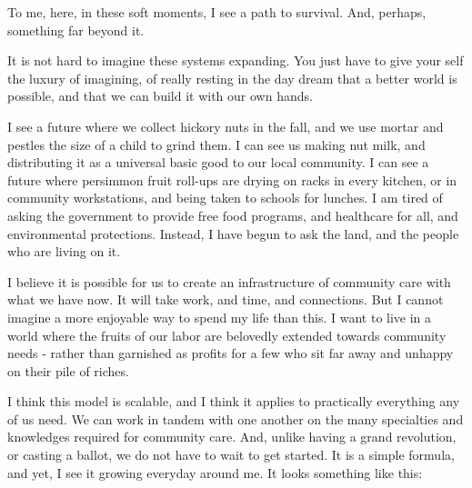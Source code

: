 \documentclass[
]{book}
\begin{document}
To me, here, in these soft moments, I see a path to survival. And, perhaps, something far beyond it.

It is not hard to imagine these systems expanding. You just have to give your self the luxury of imagining, of really resting in the day dream that a better world is possible, and that we can build it with our own hands.

I see a future where we collect hickory nuts in the fall, and we use mortar and pestles the size of a child to grind them. I can see us making nut milk, and distributing it as a universal basic good to our local community. I can see a future where persimmon fruit roll-ups are drying on racks in every kitchen, or in community workstations, and being taken to schools for lunches. I am tired of asking the government to provide free food programs, and healthcare for all, and environmental protections. Instead, I have begun to ask the land, and the people who are living on it.

I believe it is possible for us to create an infrastructure of community care with what we have now. It will take work, and time, and connections. But I cannot imagine a more enjoyable way to spend my life than this. I want to live in a world where the fruits of our labor are belovedly extended towards community needs - rather than garnished as profits for a few who sit far away and unhappy on their pile of riches.

I think this model is scalable, and I think it applies to practically everything any of us need. We can work in tandem with one another on the many specialties and knowledges required for community care. And, unlike having a grand revolution, or casting a ballot, we do not have to wait to get started. It is a simple formula, and yet, I see it growing everyday around me. It looks something like this:
\end{document}
